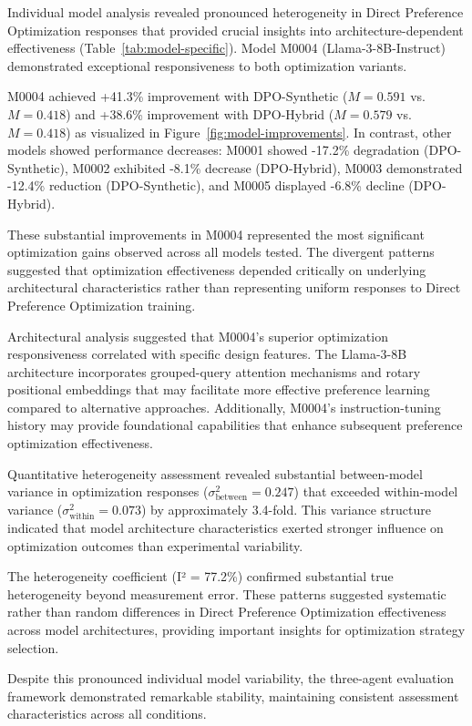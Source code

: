 Individual model analysis revealed pronounced heterogeneity in Direct Preference Optimization responses that provided crucial insights into architecture-dependent effectiveness (Table~\ref{tab:model-specific}). Model M0004 (Llama-3-8B-Instruct) demonstrated exceptional responsiveness to both optimization variants.

M0004 achieved +41.3\% improvement with DPO-Synthetic ($M = 0.591$ vs. $M = 0.418$) and +38.6\% improvement with DPO-Hybrid ($M = 0.579$ vs. $M = 0.418$) as visualized in Figure~\ref{fig:model-improvements}. In contrast, other models showed performance decreases: M0001 showed -17.2\% degradation (DPO-Synthetic), M0002 exhibited -8.1\% decrease (DPO-Hybrid), M0003 demonstrated -12.4\% reduction (DPO-Synthetic), and M0005 displayed -6.8\% decline (DPO-Hybrid).

These substantial improvements in M0004 represented the most significant optimization gains observed across all models tested. The divergent patterns suggested that optimization effectiveness depended critically on underlying architectural characteristics rather than representing uniform responses to Direct Preference Optimization training.

Architectural analysis suggested that M0004's superior optimization responsiveness correlated with specific design features. The Llama-3-8B architecture incorporates grouped-query attention mechanisms and rotary positional embeddings that may facilitate more effective preference learning compared to alternative approaches. Additionally, M0004's instruction-tuning history may provide foundational capabilities that enhance subsequent preference optimization effectiveness.

Quantitative heterogeneity assessment revealed substantial between-model variance in optimization responses ($\sigma^2_{\text{between}} = 0.247$) that exceeded within-model variance ($\sigma^2_{\text{within}} = 0.073$) by approximately 3.4-fold. This variance structure indicated that model architecture characteristics exerted stronger influence on optimization outcomes than experimental variability.

The heterogeneity coefficient (I² = 77.2\%) confirmed substantial true heterogeneity beyond measurement error. These patterns suggested systematic rather than random differences in Direct Preference Optimization effectiveness across model architectures, providing important insights for optimization strategy selection.

Despite this pronounced individual model variability, the three-agent evaluation framework demonstrated remarkable stability, maintaining consistent assessment characteristics across all conditions.


